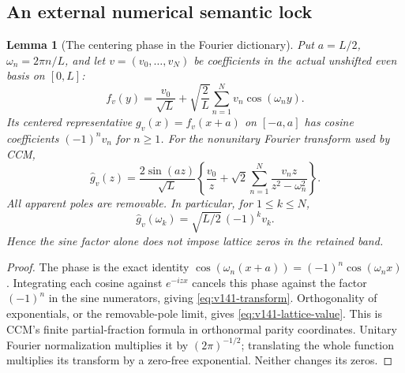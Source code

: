 \documentclass[11pt]{article}
\newtheorem{lemma}[theorem]{Lemma}
\theoremstyle{remark}
\begin{document}
\subsection{An external numerical semantic lock}

\begin{lemma}[The centering phase in the Fourier dictionary]
\label{lem:v141-centering}
Put $a=L/2$, $\omega_n=2\pi n/L$, and let $v=(v_0,\ldots,v_N)$
be coefficients in the actual unshifted even basis on $[0,L]$:
\[
 f_v(y)=\frac{v_0}{\sqrt L}
       +\sqrt{\frac2L}\sum_{n=1}^Nv_n\cos(\omega_n y).
\]
Its centered representative $g_v(x)=f_v(x+a)$ on $[-a,a]$ has
cosine coefficients $(-1)^nv_n$ for $n\ge1$. For the nonunitary
Fourier transform used by CCM,
\begin{equation}\label{eq:v141-transform}
 \widehat g_v(z)=\frac{2\sin(az)}{\sqrt L}
 \left\{\frac{v_0}{z}+\sqrt2\sum_{n=1}^N
          \frac{v_nz}{z^2-\omega_n^2}\right\}.
\end{equation}
All apparent poles are removable. In particular, for $1\le k\le N$,
\begin{equation}\label{eq:v141-lattice-value}
 \widehat g_v(\omega_k)=\sqrt{L/2}\,(-1)^kv_k.
\end{equation}
Hence the sine factor alone does not impose lattice zeros in the
retained band.
\end{lemma}
\begin{proof}
The phase is the exact identity
$\cos(\omega_n(x+a))=(-1)^n\cos(\omega_nx)$.
Integrating each cosine against $e^{-izx}$ cancels this phase
against the factor $(-1)^n$ in the sine numerators, giving
\eqref{eq:v141-transform}. Orthogonality of exponentials, or the
removable-pole limit, gives \eqref{eq:v141-lattice-value}.
This is CCM's finite partial-fraction formula in orthonormal parity
coordinates. Unitary Fourier normalization multiplies it by
$(2\pi)^{-1/2}$; translating the whole function multiplies its
transform by a zero-free exponential. Neither changes its zeros.
\end{proof}
\end{document}
